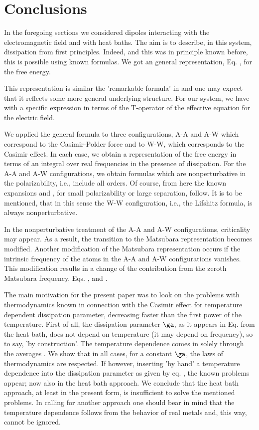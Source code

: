 \documentclass[notitlepage,prd,aps,longbibliography,twocolumn]{revtex4-1}
\begin{document}
%
\section{\label{T6}Conclusions}
%
In the foregoing sections we considered dipoles interacting with the electromagnetic field and with heat baths. The aim is to describe, in this system, dissipation from first principles. Indeed, and this was in principle known before, this is possible using known formulas. We got an general representation, Eq. , for the free energy.

This representation is similar the  'remarkable formula' in \cite{ford85-55-2273} and one may expect  that it reflects some more general underlying structure. For our system, we have with  a specific expression in terms of the T-operator of the effective equation  for the electric field.

We applied the general formula to three configurations, A-A and A-W which correspond to the Casimir-Polder force and to W-W, which corresponds to the Casimir effect. In each case, we obtain a representation of the free energy in terms of an integral over real frequencies in the presence of dissipation. For the A-A and A-W configurations, we obtain formulas which are  nonperturbative in the polarizability, i.e., include all orders. Of course, from here the known expansions  and , for small polarizability or large separation, follow. It is to be mentioned, that in this sense the W-W configuration, i.e., the Lifshitz formula, is always nonperturbative.

In the nonperturbative treatment of the A-A and A-W configurations, criticality may appear. As a result, the transition to the Matsubara representation becomes modified.
Another modification of the Matsubara representation occurs if the intrinsic frequency of the atoms in the A-A and A-W configurations vanishes. This modification results in a change of the contribution from the zeroth Matsubara frequency, Eqs. , and .

The main motivation for the present paper was to look on the problems with thermodynamics known in connection with the Casimir effect for temperature dependent dissipation parameter, decreasing faster than the first power of the temperature. First of all, the dissipation parameter $\ga$, as it appears in Eq.  from the heat bath, does not depend on temperature (it may depend on frequency), so to say, 'by construction'. The temperature dependence comes in solely through the averages . We show that in all cases, for a constant $\ga$, the laws of thermodynamics are respected. If however, inserting 'by hand' a temperature dependence into the dissipation parameter as given by eq.  , the known problems appear; now also in the heat bath approach. We conclude that the heat bath approach, at least in the present form, is insufficient to solve the mentioned problems. In calling for another approach one should bear in mind that the temperature dependence  follows from the behavior of real metals and, this way, cannot be ignored.






\end{document}
